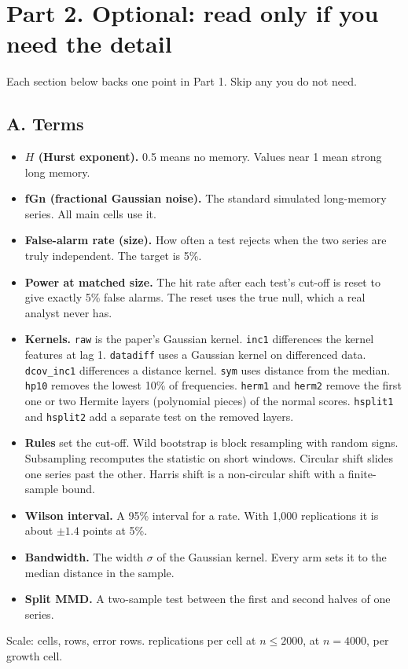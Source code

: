 \documentclass[11pt,a4paper]{article}
\newcommand{\kn}[1]{\texttt{#1}}
\begin{document}
\newpage
\section*{Part 2. Optional: read only if you need the detail}
{\color{ink2} Each section below backs one point in Part 1. Skip any you do not need.}

\subsection*{A. Terms}
\begin{small}
\begin{itemize}
\item \textbf{$H$ (Hurst exponent).} 0.5 means no memory. Values near 1 mean strong long memory.
\item \textbf{fGn (fractional Gaussian noise).} The standard simulated long-memory series. All main cells use it.
\item \textbf{False-alarm rate (size).} How often a test rejects when the two series are truly independent. The target is 5\%.
\item \textbf{Power at matched size.} The hit rate after each test's cut-off is reset to give exactly 5\% false alarms.
  The reset uses the true null, which a real analyst never has.
\item \textbf{Kernels.} \kn{raw} is the paper's Gaussian kernel. \kn{inc1} differences the kernel features at lag 1.
  \kn{datadiff} uses a Gaussian kernel on differenced data. \kn{dcov\_inc1} differences a distance kernel.
  \kn{sym} uses distance from the median. \kn{hp10} removes the lowest 10\% of frequencies.
  \kn{herm1} and \kn{herm2} remove the first one or two Hermite layers (polynomial pieces) of the normal scores.
  \kn{hsplit1} and \kn{hsplit2} add a separate test on the removed layers.
\item \textbf{Rules} set the cut-off. Wild bootstrap is block resampling with random signs. Subsampling recomputes the statistic on short windows.
  Circular shift slides one series past the other. Harris shift is a non-circular shift with a finite-sample bound.
\item \textbf{Wilson interval.} A 95\% interval for a rate. With 1{,}000 replications it is about $\pm1.4$ points at 5\%.
\item \textbf{Bandwidth.} The width $\sigma$ of the Gaussian kernel. Every arm sets it to the median distance in the sample.
\item \textbf{Split MMD.} A two-sample test between the first and second halves of one series.
\end{itemize}
\end{small}
{\color{ink2}\small Scale:  cells,  rows,  error rows.
 replications per cell at $n \le 2000$,  at $n = 4000$,  per growth cell.}
\end{document}
